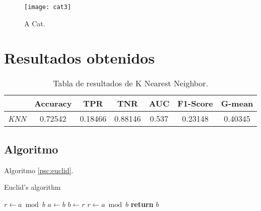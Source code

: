 \documentclass[12pt]{article} %
\begin{document}
\begin{figure}[H]
  \centering
  \texttt{[image: cat3]}
  \caption{A Cat.}
  \label{fig:cat3}
  \vspace{-20pt}
\end{figure}

\lipsum[10]


\section{Resultados obtenidos}

\lipsum[11]

\begin{table}[H]
  \centering
  \begin{tabular}{l | c | c | c | c | c | c}
    & \textbf{Accuracy} & \textbf{TPR} & \textbf{TNR} & \textbf{AUC} & \textbf{F1-Score} & \textbf{G-mean} \\ \hline
    \textit{KNN} & 0.72542 & 0.18466 & 0.88146 & 0.537 & 0.23148 & 0.40345 \\
  \end{tabular}
  \caption{Tabla de resultados de K Nearest Neighbor.}\label{tab:meas-knn}
  \vspace{-20pt}
\end{table}

\lipsum[12]

\subsection{Algoritmo}

\lipsum[13-14]

Algoritmo \autoref{psc:euclid}.

\begin{algorithm}[H]
  \caption{Euclid’s algorithm}\label{psc:euclid}
  \begin{algorithmic}[1]
    \State $r\gets a\bmod b$
    \State $a\gets b$
    \State $b\gets r$
    \State $r\gets a\bmod b$
    \EndWhile\label{euclidendwhile}
    \State \textbf{return} $b$
  \EndProcedure
  \end{algorithmic}
\end{algorithm}

\lipsum[14]


\newpage

\end{document}
